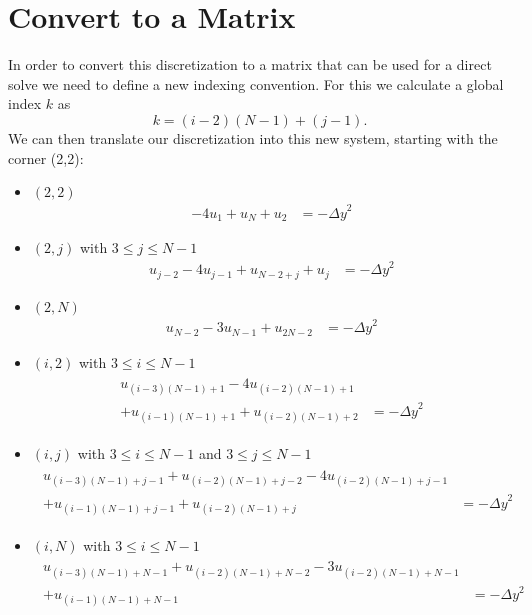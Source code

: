 \documentclass[11pt]{article}
\begin{document}
	\section{Convert to a Matrix}
	In order to convert this discretization to a matrix that can be used for a direct solve we need to define a new indexing convention. For this we calculate a global index $ k $ as
	\begin{equation}
		k = (i-2)(N-1) + (j-1).
	\end{equation}
	We can then translate our discretization into this new system, starting with the corner (2,2):
	\begin{itemize}
		\item $ (2,2) $
		\begin{align*}
			- 4u_1 + u_{N} + u_2 &= -{\Delta y}^2
		\end{align*}
		\item $ (2,j) $ with $ 3\leq j\leq N-1 $
		\begin{align*}
			u_{j-2} - 4u_{j-1} + u_{N-2+j} + u_j &= -{\Delta y}^2
		\end{align*}
		\item $ (2,N) $
		\begin{align*}
			u_{N-2} - 3u_{N-1} + u_{2N-2} &= -{\Delta y}^2
		\end{align*}
		\item $ (i,2) $ with $ 3\leq i\leq N-1 $
		\begin{align*}
			\begin{split}
				u_{(i-3)(N-1)+1} - 4u_{(i-2)(N-1)+1} \\+ u_{(i-1)(N-1)+1} + u_{(i-2)(N-1)+2} &= -{\Delta y}^2
			\end{split}
		\end{align*}
		\item $ (i,j) $ with $ 3\leq i\leq N-1 $ and $ 3\leq j\leq N-1 $
		\begin{align*}
			\begin{split}
				u_{(i-3)(N-1)+j-1} + u_{(i-2)(N-1)+j-2} - 4u_{(i-2)(N-1)+j-1}\\ + u_{(i-1)(N-1)+j-1} + u_{(i-2)(N-1)+j}& = -{\Delta y}^2
			\end{split}
		\end{align*}
		\item $ (i,N) $ with $ 3\leq i\leq N-1 $
		\begin{align*}
			\begin{split}
				u_{(i-3)(N-1)+N-1} + u_{(i-2)(N-1)+N-2} - 3u_{(i-2)(N-1)+N-1} \\+ u_{(i-1)(N-1)+N-1} &= -{\Delta y}^2

\end{split}
\end{align*}
\end{itemize}
\end{document}
